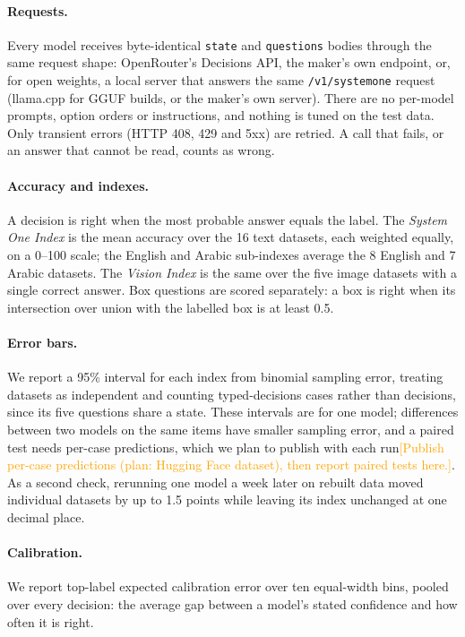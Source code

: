 \documentclass[11pt]{article}
\newcommand{\draftnote}[1]{\textcolor{orange}{[#1]}}
\begin{document}
\paragraph{Requests.} Every model receives byte-identical \texttt{state} and \texttt{questions} bodies through the
same request shape: OpenRouter's Decisions API, the maker's own endpoint, or, for open weights, a local server that
answers the same \texttt{/v1/systemone} request (llama.cpp \citep{gerganov2023llamacpp} for GGUF builds, or the
maker's own server). There are no
per-model prompts, option orders or instructions, and nothing is tuned on the test data. Only transient errors (HTTP
408, 429 and 5xx) are retried. A call that fails, or an answer that cannot be read, counts as wrong.

\paragraph{Accuracy and indexes.} A decision is right when the most probable answer equals the label. The
\emph{System One Index} is the mean accuracy over the 16 text datasets, each weighted equally, on a 0--100 scale; the
English and Arabic sub-indexes average the 8 English and 7 Arabic datasets. The \emph{Vision Index} is the same over
the five image datasets with a single correct answer. Box questions are scored separately: a box is right when its
intersection over union with the labelled box is at least 0.5.

\paragraph{Error bars.} We report a 95\% interval for each index from binomial sampling error, treating datasets as
independent and counting typed-decisions cases rather than decisions, since its five questions share a state. These
intervals are for one model; differences between two models on the same items have smaller sampling error, and a
paired test needs per-case predictions, which we plan to publish with each run\draftnote{Publish per-case predictions (plan: Hugging Face dataset), then report paired tests here.}. As a second check, rerunning one model a week later on
rebuilt data moved individual datasets by up to 1.5 points while leaving its index unchanged at one decimal place.

\paragraph{Calibration.} We report top-label expected calibration error \citep{naeini2015obtaining,guo2017calibration}
over ten equal-width bins, pooled over every decision: the average gap between a model's stated confidence and how
often it is right.
\end{document}
